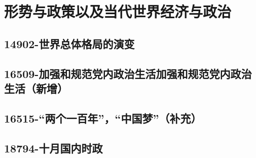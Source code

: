 \section{形势与政策以及当代世界经济与政治}


\subsection{14902-世界总体格局的演变}

\subsection{16509-加强和规范党内政治生活加强和规范党内政治生活（新增）}

\subsection{16515-“两个一百年”，“中国梦”（补充）}

\subsection{18794-十月国内时政}

